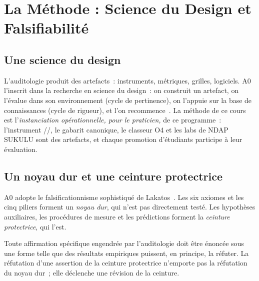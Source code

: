\section{La Méthode : Science du Design et Falsifiabilité}
\label{sec:c30-methode}

\subsection{Une science du design}

L'auditologie produit des artefacts~: instruments, métriques, grilles,
logiciels. A0 l'inscrit dans la recherche en science du design~: on
construit un artefact, on l'évalue dans son environnement (cycle de
pertinence), on l'appuie sur la base de connaissances (cycle de rigueur),
et l'on recommence~\cite{hevner2004design}. La méthode de ce cours est
l'\emph{instanciation opérationnelle, pour le praticien,} de ce programme~:
l'instrument \OUI{}/\NON{}/\NEK{}, le gabarit canonique, le classeur O4 et
les labs de NDAP SUKULU sont des artefacts, et chaque promotion
d'étudiants participe à leur évaluation.

\subsection{Un noyau dur et une ceinture protectrice}

A0 adopte le falsificationnisme sophistiqué de Lakatos~\cite{lakatos1970}.
Les six axiomes et les cinq piliers forment un \emph{noyau dur}, qui n'est
pas directement testé. Les hypothèses auxiliaires, les procédures de
mesure et les prédictions forment la \emph{ceinture protectrice}, qui l'est.

\begin{axiome}
Toute affirmation spécifique engendrée par l'auditologie doit être énoncée
sous une forme telle que des résultats empiriques puissent, en principe, la
réfuter. La réfutation d'une assertion de la ceinture protectrice n'emporte
pas la réfutation du noyau dur~; elle déclenche une révision de la
ceinture.
\end{axiome}

